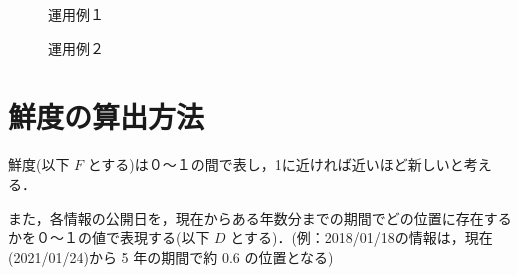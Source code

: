 \begin{figure}[htbp]
  \begin{minipage}{0.5\hsize}
    \begin{center}
    \end{center}
    \caption{運用例１}
  \end{minipage}
  \begin{minipage}{0.5\hsize}
    \begin{center}
    \end{center}
    \caption{運用例２}
  \end{minipage}
\end{figure}

\section{鮮度の算出方法}
\label{sec:imp_calculation}

鮮度(以下 $F$ とする)は０～１の間で表し，1に近ければ近いほど新しいと考える．

また，各情報の公開日を，現在からある年数分までの期間でどの位置に存在するかを０～１の値で表現する(以下 $D$ とする)．(例：2018/01/18の情報は，現在(2021/01/24)から 5 年の期間で約 0.6 の位置となる)

